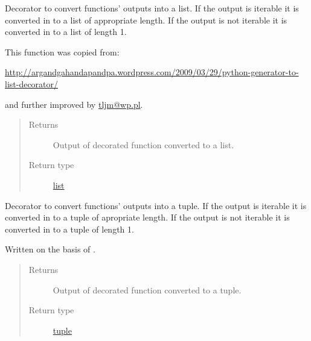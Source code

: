 \documentclass[a4paper,10pt,english]{sphinxmanual}
\begin{document}

\begin{fulllineitems}
\label{aqueduct.utils.helpers:aqueduct.utils.helpers.listify}
Decorator to convert functions' outputs into a list. If the output is iterable it is converted in to a list
of appropriate length. If the output is not iterable it is converted in to a list of length 1.

This function was copied from:

\url{http://argandgahandapandpa.wordpress.com/2009/03/29/python-generator-to-list-decorator/}

and further improved by \href{mailto:tljm@wp.pl}{tljm@wp.pl}.
\begin{quote}\begin{description}
\item[{Returns}] \leavevmode
Output of decorated function converted to a list.

\item[{Return type}] \leavevmode
\href{http://docs.python.org/2/library/functions.html\#list}{list}

\end{description}\end{quote}

\end{fulllineitems}


\begin{fulllineitems}
\label{aqueduct.utils.helpers:aqueduct.utils.helpers.tupleify}
Decorator to convert functions' outputs into a tuple. If the output is iterable it is converted in to a tuple
of apropriate length. If the output is not iterable it is converted in to a tuple of length 1.

Written on the basis of {\hyperref[aqueduct.utils.helpers:aqueduct.utils.helpers.listify]{}}.
\begin{quote}\begin{description}
\item[{Returns}] \leavevmode
Output of decorated function converted to a tuple.

\item[{Return type}] \leavevmode
\href{http://docs.python.org/2/library/functions.html\#tuple}{tuple}

\end{description}\end{quote}

\end{fulllineitems}
\end{document}
